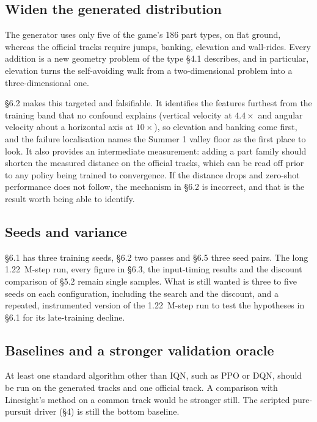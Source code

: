 \documentclass[11pt]{article}
\begin{document}
\subsection{Widen the generated distribution}

The generator uses only five of the game's 186 part types, on flat ground, whereas the official tracks require jumps, banking, elevation and wall-rides. Every addition is a new geometry problem of the type \S4.1 describes, and in particular, elevation turns the self-avoiding walk from a two-dimensional problem into a three-dimensional one.

\S6.2 makes this targeted and falsifiable. It identifies the features furthest from the training band that no confound explains (vertical velocity at $4.4\times$ and angular velocity about a horizontal axis at $10\times$), so elevation and banking come first, and the failure localisation names the Summer 1 valley floor as the first place to look. It also provides an intermediate measurement: adding a part family should shorten the measured distance on the official tracks, which can be read off prior to any policy being trained to convergence. If the distance drops and zero-shot performance does not follow, the mechanism in \S6.2 is incorrect, and that is the result worth being able to identify.

\subsection{Seeds and variance}

\S6.1 has three training seeds, \S6.2 two passes and \S6.5 three seed pairs. The long 1.22~M-step run, every figure in \S6.3, the input-timing results and the discount comparison of \S5.2 remain single samples. What is still wanted is three to five seeds on each configuration, including the search and the discount, and a repeated, instrumented version of the 1.22~M-step run to test the hypotheses in \S6.1 for its late-training decline.

\subsection{Baselines and a stronger validation oracle}

At least one standard algorithm other than IQN, such as PPO or DQN, should be run on the generated tracks and one official track. A comparison with Linesight's method on a common track would be stronger still. The scripted pure-pursuit driver (\S4) is still the bottom baseline.
\end{document}
